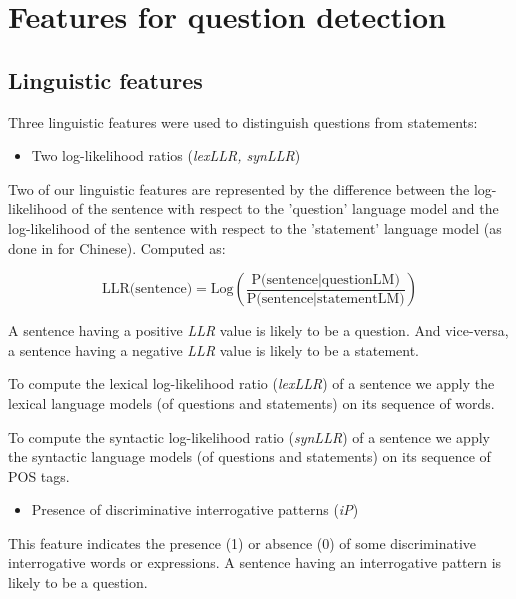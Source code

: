 \documentclass[runningheads,a4paper]{llncs}
\begin{document}
\section{Features for question detection}

\subsection{Linguistic features}

Three linguistic features were used to distinguish questions from statements:

\begin{itemize}
\item Two log-likelihood ratios ({\it lexLLR, synLLR})
\end{itemize}

Two of our linguistic features are represented by the difference between the log-likelihood of the sentence with respect to the 'question' language model and the log-likelihood of the sentence with respect to the 'statement' language model (as done in \cite{Yuan:2005} for Chinese). Computed as:


\begin{equation}
\text{LLR(sentence)}=\text{Log}\left(\frac{\text{P(sentence} \rvert \text{questionLM)}}{\text{P(sentence} \rvert \text{statementLM)}}\right)
\end{equation}

A sentence having a positive {\it LLR} value is likely to be a question. And vice-versa, a sentence having a negative {\it LLR} value is likely to be a statement.

To compute the lexical log-likelihood ratio ({\it lexLLR}) of a sentence we apply the lexical language models (of questions and statements) on its sequence of words.

To compute the syntactic log-likelihood ratio ({\it synLLR}) of a sentence we apply the syntactic language models (of questions and statements) on its sequence of POS tags.


\begin{itemize}
\item Presence of discriminative interrogative patterns ({\it iP})
\end{itemize}

This feature indicates the presence (1) or absence (0) of some discriminative interrogative words or expressions. A sentence having an interrogative pattern is likely to be a question.
\end{document}
